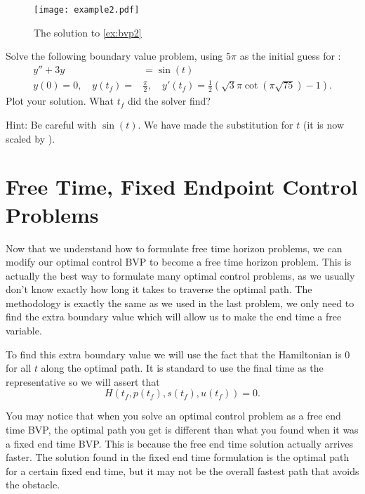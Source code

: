 \begin{figure}[H]
    \centering
    \texttt{[image: example2.pdf]}
    \caption{The solution to \ref{ex:bvp2}}
\end{figure}

\begin{problem}
\label{prob:obstacle:bvp3}
Solve the following boundary value problem, using $5 \pi$ as the initial guess for :
\begin{align*}
    y'' + 3y &= \sin(t)\\
    y(0) = 0,\quad y(t_f) = &\frac{\pi}{2}, \quad y'(t_f) = \frac{1}{2}\left(\sqrt{3}\pi \cot(\pi\sqrt{75}) - 1 \right).
\end{align*}
Plot your solution. What $t_f$ did the solver find?

Hint: Be careful with $\sin(t)$. We have made the substitution for $t$ (it is now scaled by ).
\end{problem}


\section*{Free Time, Fixed Endpoint Control Problems}

Now that we understand how to formulate free time horizon problems, we can modify our optimal control BVP to become a free time horizon problem.
This is actually the best way to formulate many optimal control problems, as we usually don't know exactly how long it takes to traverse the optimal path. The methodology is exactly the same as we used in the last problem, we only need to find the extra boundary value which will allow us to make the end time a free variable.

To find this extra boundary value we will use the fact that the Hamiltonian is 0 for all $t$ along the optimal path. It is standard to use the final time as the representative so we will assert that
\begin{equation}\label{eq:ex-boundary-value}
    H(t_f,p(t_f),s(t_f),u(t_f)) = 0.
\end{equation}

You may notice that when you solve an optimal control problem as a free end time BVP, the optimal path you get is different than what you found when it was a fixed end time BVP.
This is because the free end time solution actually arrives faster.
The solution found in the fixed end time formulation is the optimal path for a certain fixed end time, but it may not be the overall fastest path that avoids the obstacle.


